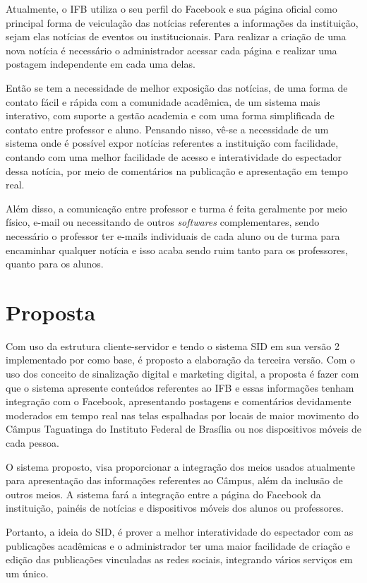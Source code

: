 Atualmente, o IFB utiliza o seu perfil do Facebook e sua página oficial como principal forma de veiculação das notícias referentes a informações da instituição, sejam elas notícias de eventos ou institucionais. Para realizar a criação de uma nova notícia é necessário o administrador acessar cada página e realizar uma postagem independente em cada uma delas. 

Então se tem a necessidade de melhor exposição das notícias, de uma forma de contato fácil e rápida com a comunidade acadêmica, de um sistema mais interativo, com suporte a gestão academia e com uma forma simplificada de contato entre professor e aluno. Pensando nisso, vê-se a necessidade de um sistema onde é possível expor notícias referentes a instituição com facilidade, contando com uma melhor facilidade de acesso e interatividade do espectador dessa notícia, por meio de comentários na publicação e apresentação em tempo real.

Além disso, a comunicação entre professor e turma é feita geralmente por meio físico, e-mail ou necessitando de outros \textit{softwares} complementares, sendo necessário o professor ter e-mails individuais de cada aluno ou de turma para encaminhar qualquer notícia e isso acaba sendo ruim tanto para os professores, quanto para os alunos. 

\section{Proposta}
Com uso da estrutura cliente-servidor e tendo o sistema SID em sua versão 2 implementado por \cite{sobrinho2017} como base, é proposto a elaboração da terceira versão. Com o uso dos conceito de sinalização digital e marketing digital, a proposta é fazer com que o sistema apresente conteúdos referentes ao IFB e essas informações tenham integração com o Facebook, apresentando postagens e comentários devidamente moderados em tempo real nas telas espalhadas por locais de maior movimento do Câmpus Taguatinga do Instituto Federal de Brasília ou nos dispositivos móveis de cada pessoa. 

O sistema proposto, visa proporcionar a integração dos meios usados atualmente para apresentação das informações referentes ao Câmpus, além da inclusão de outros meios. A sistema fará a integração entre a página do Facebook da instituição, painéis de notícias e dispositivos móveis dos alunos ou professores.

Portanto, a ideia do SID, é prover a melhor interatividade do espectador com as publicações acadêmicas e o administrador ter uma maior facilidade de criação e edição das publicações vinculadas as redes sociais, integrando vários serviços em um único.

